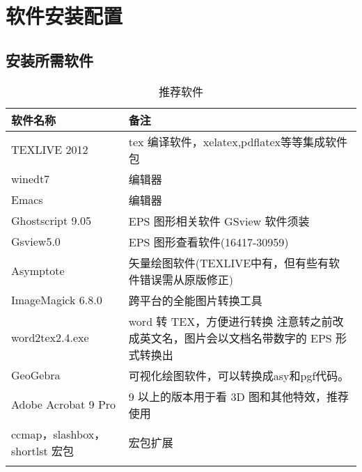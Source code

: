 \chapter{软件安装配置}
 \thispagestyle{fancy}
\fancyhead[R]{\song\wuhao \leftmark}


\section{安装所需软件}
%
%
\begin{table}[htbp]
  \caption{推荐软件}\label{soft_recommend}
  \center
\begin{tabularx}{350pt}{lX}
  \toprule   \rowcolor{backcolor}
  软件名称 & 备注\\
  \midrule
  TEXLIVE 2012 &  tex 编译软件，xelatex,pdflatex等等集成软件包  \\ \rowcolor{lightgray}
  winedt7 &  编辑器\\
  Emacs & 编辑器 \\ \rowcolor{lightgray}
  Ghostscript 9.05 & EPS 图形相关软件 GSview 软件须装 \\
  Gsview5.0 & EPS 图形查看软件(\textcolor[rgb]{0.00,0.00,1.00}{16417-30959}) \\\rowcolor{lightgray}
  Asymptote & 矢量绘图软件(TEXLIVE中有，但有些有软件错误需从原版修正) \\
  \parbox[t]{6cm}{ImageMagick 6.8.0}& 跨平台的全能图片转换工具\\ 
  word2tex2.4.exe   & word 转 TEX，方便进行转换
  注意转之前改成英文名，图片会以文档名带数字的 EPS 形式转换出\\
  GeoGebra & 可视化绘图软件，可以转换成asy和pgf代码。\\ 
  Adobe Acrobat 9 Pro & 9 以上的版本用于看 3D 图和其他特效，推荐使用\\
  ccmap，slashbox，shortlst 宏包 & 宏包扩展 \\

  \bottomrule
\end{tabularx}
\end{table}

%

